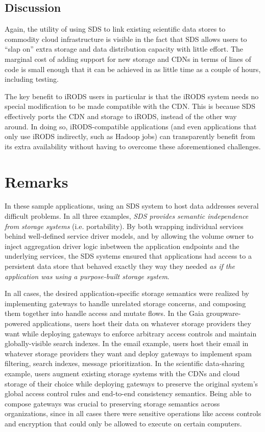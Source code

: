 \subsection{Discussion}

Again, the utility of using SDS to link existing scientific data stores to
commodity cloud infrastructure is visible in the fact that SDS allows users to ``slap
on'' extra storage and data distribution capacity with little effort.  The
marginal cost of adding support for new storage and CDNs in terms of lines of
code is small enough that it can be achieved in as little time as a couple
of hours, including testing.

The key benefit to iRODS users in particular is that the iRODS system needs no
special modification to be made compatible with the CDN.  This is because
SDS effectively ports the CDN and storage to iRODS, instead of the other way around.
In doing so, iRODS-compatible applications (and even applications that only use
iRODS indirectly, such as Hadoop jobs) can transparently benefit from its extra
availability without having to overcome these aforementioned challenges.

\section{Remarks}

In these sample applications, using an SDS system to host data addresses
several difficult problems.  In all three examples, 
\emph{SDS provides semantic independence from storage systems} (i.e.
portability).  By both wrapping individual services behind well-defined service driver models, and by
allowing the volume owner to inject aggregation driver logic inbetween the
application endpoints and the underlying services, the SDS systems ensured that applications
had access to a persistent data store that behaved exactly they way they needed
\emph{as if the application was using a purpose-built storage system}.

In all cases, the desired application-specific storage semantics were realized
by implementing gateways to handle unrelated storage concerns, and composing them
together into handle access and mutate flows.
In the Gaia groupware-powered applications, users host their data on whatever storage providers they want
while deploying gateways to enforce arbitrary access controls and maintain globally-visible search
indexes.  In the email example, users host
their email in whatever storage providers they want and deploy gateways to
implement spam filtering, search indexes, message prioritization.  In the scientific
data-sharing example, users augment existing storage systems with the CDNs and cloud
storage of their choice while deploying gateways to preserve the original system's global access
control rules and end-to-end consistency semantics.  Being able to compose
gateways was crucial to preserving storage semantics across organizations, since
in all cases there were sensitive operations like access controls and encryption
that could only be allowed to execute on certain computers.

